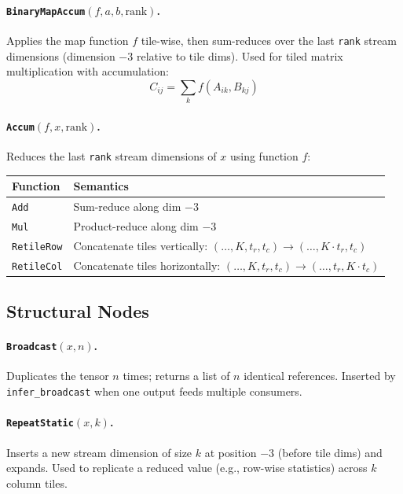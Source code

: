 \documentclass[11pt]{article}
\begin{document}
\paragraph{\texttt{BinaryMapAccum}$(f, a, b, \text{rank})$.}
Applies the map function $f$ tile-wise, then sum-reduces over the last \texttt{rank} stream dimensions (dimension $-3$ relative to tile dims).
Used for tiled matrix multiplication with accumulation:
\[
  C_{ij} = \sum_k f(A_{ik}, B_{kj})
\]

\paragraph{\texttt{Accum}$(f, x, \text{rank})$.}
Reduces the last \texttt{rank} stream dimensions of $x$ using function $f$:

\begin{center}
\begin{tabular}{ll}
\toprule
\textbf{Function} & \textbf{Semantics} \\
\midrule
\texttt{Add}       & Sum-reduce along dim $-3$ \\
\texttt{Mul}       & Product-reduce along dim $-3$ \\
\texttt{RetileRow} & Concatenate tiles vertically: $(\ldots, K, t_r, t_c) \to (\ldots, K \cdot t_r, t_c)$ \\
\texttt{RetileCol} & Concatenate tiles horizontally: $(\ldots, K, t_r, t_c) \to (\ldots, t_r, K \cdot t_c)$ \\
\bottomrule
\end{tabular}
\end{center}

\subsection{Structural Nodes}

\paragraph{\texttt{Broadcast}$(x, n)$.}
Duplicates the tensor $n$ times; returns a list of $n$ identical references.
Inserted by \texttt{infer\_broadcast} when one output feeds multiple consumers.

\paragraph{\texttt{RepeatStatic}$(x, k)$.}
Inserts a new stream dimension of size $k$ at position $-3$ (before tile dims) and expands.
Used to replicate a reduced value (e.g., row-wise statistics) across $k$ column tiles.
\end{document}
